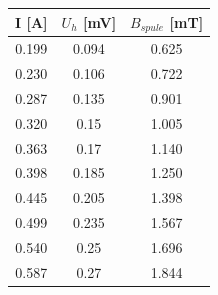 \begin{minipage}[h]{0.35\linewidth}

\begin{tabular}{|c|c|c|}
\hline 
I [A] & $U_h$ [mV] & $B_{spule}$ [mT] \\ 
\hline 
0.199 & 0.094 & 0.625
 \\ 
\hline 
0.230 & 0.106 & 0.722
 \\ 
\hline 
0.287 & 0.135 & 0.901
 \\ 
\hline 
0.320 & 0.15 & 1.005
 \\ 
\hline 
0.363 & 0.17 & 1.140
 \\ 
\hline 
0.398 & 0.185 & 1.250
 \\ 
\hline 
0.445 & 0.205 & 1.398
 \\ 
\hline 
0.499 & 0.235 & 1.567
 \\ 
\hline 
0.540 & 0.25 & 1.696
 \\ 
\hline 
0.587 & 0.27 & 1.844
 \\ 
\hline 
\end{tabular} 
\label{tab:eichspule}

\end{minipage}
\hfill

